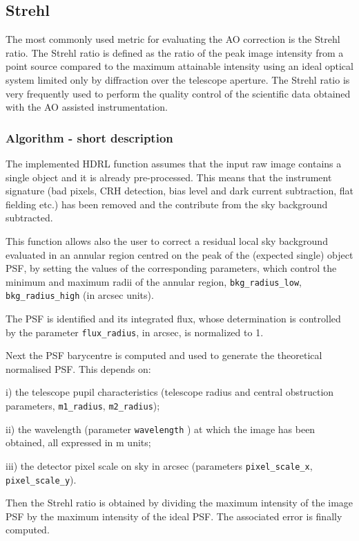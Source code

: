 \subsection{Strehl}
\label{strehl:main}

The most commonly used metric for evaluating the AO correction is the Strehl
ratio. The Strehl ratio is defined as the ratio of the peak image intensity
from a point source compared to the maximum attainable intensity using an
ideal optical system limited only by diffraction over the telescope aperture.
The Strehl ratio is very frequently used to perform the quality control of
the scientific data obtained with the AO assisted instrumentation.

 
\subsubsection{Algorithm - short description}

 The implemented HDRL function assumes that the input raw image
 contains a single object and it is
 already pre-processed. This means that the instrument signature (bad pixels,
CRH detection, bias level and dark current subtraction,  flat fielding
etc.) has been removed and the contribute from the sky background subtracted.
 
 This function allows also the user to correct a residual
 local sky background evaluated in an annular region centred on the peak of the
 (expected single) object PSF, by setting the values of the
 corresponding parameters, which control the minimum and maximum radii
 of the annular region,  \verb+bkg_radius_low+,
 \verb+bkg_radius_high+ (in arcsec units). 

 The PSF is identified and its integrated flux, whose determination is
 controlled by the parameter \verb+flux_radius+, in arcsec, is normalized to 1. 

 Next the PSF barycentre is computed and used to generate the
 theoretical normalised PSF. This depends on: 

 i) the telescope pupil
 characteristics (telescope radius and central obstruction parameters, 
 \verb+m1_radius+, \verb+m2_radius+); 

 ii) the wavelength (parameter \verb+wavelength+ ) at which the image 
 has been obtained, all expressed in m units; 
 
 iii) the detector pixel scale on 
 sky in arcsec (parameters \verb+pixel_scale_x+, \verb+pixel_scale_y+). 
 
 Then the Strehl ratio is obtained by dividing the maximum intensity
 of the image PSF by the maximum intensity of the ideal PSF. The
 associated error is finally computed.
 
